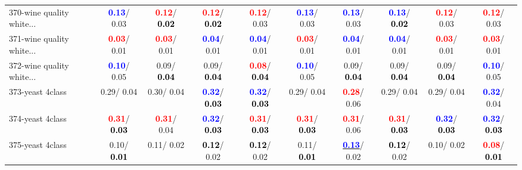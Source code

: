 \begin{table}[h]
\begin{center}
{\begin{tabular}{lc|c|c|c|c|c|c|c|c}
370-wine quality white... & \textcolor{blue}{\textbf{  0.13}}/  0.03 & \textcolor{red}{\textbf{  0.12}}/\textcolor{black}{\textbf{  0.02}} & \textcolor{red}{\textbf{  0.12}}/\textcolor{black}{\textbf{  0.02}} & \textcolor{red}{\textbf{  0.12}}/  0.03 & \textcolor{blue}{\textbf{  0.13}}/  0.03 & \textcolor{blue}{\textbf{  0.13}}/  0.03 & \textcolor{blue}{\textbf{  0.13}}/\textcolor{black}{\textbf{  0.02}} & \textcolor{red}{\textbf{  0.12}}/  0.03 & \textcolor{red}{\textbf{  0.12}}/  0.03 \\
371-wine quality white... & \textcolor{red}{\textbf{  0.03}}/  0.01 & \textcolor{red}{\textbf{  0.03}}/  0.01 & \textcolor{blue}{\textbf{  0.04}}/  0.01 & \textcolor{blue}{\textbf{  0.04}}/  0.01 & \textcolor{red}{\textbf{  0.03}}/  0.01 & \textcolor{blue}{\textbf{  0.04}}/  0.01 & \textcolor{blue}{\textbf{  0.04}}/  0.01 & \textcolor{red}{\textbf{  0.03}}/  0.01 & \textcolor{red}{\textbf{  0.03}}/  0.01 \\
372-wine quality white... & \textcolor{blue}{\textbf{  0.10}}/  0.05 &   0.09/\textcolor{black}{\textbf{  0.04}} &   0.09/\textcolor{black}{\textbf{  0.04}} & \textcolor{red}{\textbf{  0.08}}/\textcolor{black}{\textbf{  0.04}} & \textcolor{blue}{\textbf{  0.10}}/  0.05 &   0.09/\textcolor{black}{\textbf{  0.04}} &   0.09/\textcolor{black}{\textbf{  0.04}} &   0.09/\textcolor{black}{\textbf{  0.04}} & \textcolor{blue}{\textbf{  0.10}}/  0.05 \\
373-yeast 4class &   0.29/  0.04 &   0.30/  0.04 & \textcolor{blue}{\textbf{  0.32}}/\textcolor{black}{\textbf{  0.03}} & \textcolor{blue}{\textbf{  0.32}}/\textcolor{black}{\textbf{  0.03}} &   0.29/  0.04 & \textcolor{red}{\textbf{  0.28}}/  0.06 &   0.29/  0.04 &   0.29/  0.04 & \textcolor{blue}{\textbf{  0.32}}/  0.04 \\ \hline
374-yeast 4class & \textcolor{red}{\textbf{  0.31}}/\textcolor{black}{\textbf{  0.03}} & \textcolor{red}{\textbf{  0.31}}/  0.04 & \textcolor{blue}{\textbf{  0.32}}/\textcolor{black}{\textbf{  0.03}} & \textcolor{red}{\textbf{  0.31}}/\textcolor{black}{\textbf{  0.03}} & \textcolor{red}{\textbf{  0.31}}/\textcolor{black}{\textbf{  0.03}} & \textcolor{red}{\textbf{  0.31}}/  0.06 & \textcolor{red}{\textbf{  0.31}}/\textcolor{black}{\textbf{  0.03}} & \textcolor{blue}{\textbf{  0.32}}/\textcolor{black}{\textbf{  0.03}} & \textcolor{blue}{\textbf{  0.32}}/\textcolor{black}{\textbf{  0.03}} \\
375-yeast 4class &   0.10/\textcolor{black}{\textbf{  0.01}} &   0.11/  0.02 & \textcolor{black}{\textbf{  0.12}}/  0.02 & \textcolor{black}{\textbf{  0.12}}/  0.02 &   0.11/\textcolor{black}{\textbf{  0.01}} & \underline{\textcolor{blue}{\textbf{  0.13}}}/  0.02 & \textcolor{black}{\textbf{  0.12}}/  0.02 &   0.10/  0.02 & \textcolor{red}{\textbf{  0.08}}/\textcolor{black}{\textbf{  0.01}} \\

\end{tabular}}
\end{center}
\end{table}
